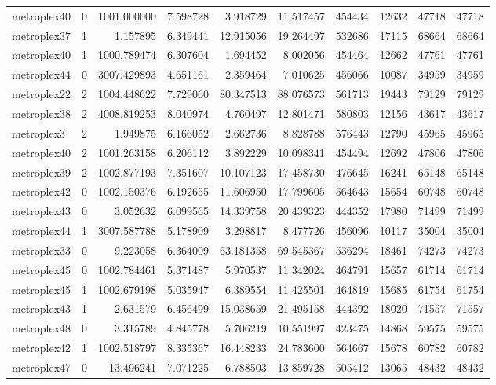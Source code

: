 \begin{longtable}{|l|r|r|r|r|r|r|r|r|r|}
metroplex40 & 0 & 1001.000000 & 7.598728 & 3.918729 & 11.517457 & 454434 & 12632 & 47718 & 47718 \\
metroplex37 & 1 & 1.157895 & 6.349441 & 12.915056 & 19.264497 & 532686 & 17115 & 68664 & 68664 \\
metroplex40 & 1 & 1000.789474 & 6.307604 & 1.694452 & 8.002056 & 454464 & 12662 & 47761 & 47761 \\
metroplex44 & 0 & 3007.429893 & 4.651161 & 2.359464 & 7.010625 & 456066 & 10087 & 34959 & 34959 \\
metroplex22 & 2 & 1004.448622 & 7.729060 & 80.347513 & 88.076573 & 561713 & 19443 & 79129 & 79129 \\
metroplex38 & 2 & 4008.819253 & 8.040974 & 4.760497 & 12.801471 & 580803 & 12156 & 43617 & 43617 \\
metroplex3 & 2 & 1.949875 & 6.166052 & 2.662736 & 8.828788 & 576443 & 12790 & 45965 & 45965 \\
metroplex40 & 2 & 1001.263158 & 6.206112 & 3.892229 & 10.098341 & 454494 & 12692 & 47806 & 47806 \\
metroplex39 & 2 & 1002.877193 & 7.351607 & 10.107123 & 17.458730 & 476645 & 16241 & 65148 & 65148 \\
metroplex42 & 0 & 1002.150376 & 6.192655 & 11.606950 & 17.799605 & 564643 & 15654 & 60748 & 60748 \\
metroplex43 & 0 & 3.052632 & 6.099565 & 14.339758 & 20.439323 & 444352 & 17980 & 71499 & 71499 \\
metroplex44 & 1 & 3007.587788 & 5.178909 & 3.298817 & 8.477726 & 456096 & 10117 & 35004 & 35004 \\
metroplex33 & 0 & 9.223058 & 6.364009 & 63.181358 & 69.545367 & 536294 & 18461 & 74273 & 74273 \\
metroplex45 & 0 & 1002.784461 & 5.371487 & 5.970537 & 11.342024 & 464791 & 15657 & 61714 & 61714 \\
metroplex45 & 1 & 1002.679198 & 5.035947 & 6.389554 & 11.425501 & 464819 & 15685 & 61754 & 61754 \\
metroplex43 & 1 & 2.631579 & 6.456499 & 15.038659 & 21.495158 & 444392 & 18020 & 71557 & 71557 \\
metroplex48 & 0 & 3.315789 & 4.845778 & 5.706219 & 10.551997 & 423475 & 14868 & 59575 & 59575 \\
metroplex42 & 1 & 1002.518797 & 8.335367 & 16.448233 & 24.783600 & 564667 & 15678 & 60782 & 60782 \\
metroplex47 & 0 & 13.496241 & 7.071225 & 6.788503 & 13.859728 & 505412 & 13065 & 48432 & 48432 \\

\end{longtable}
